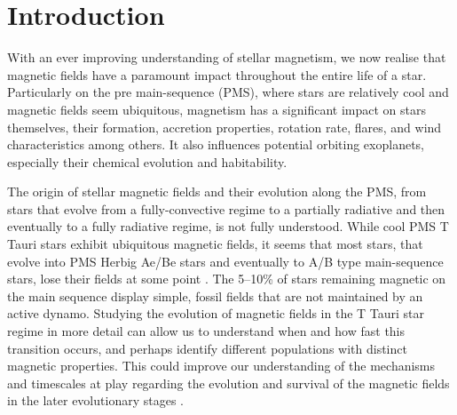 \documentclass{aa}
\begin{document}
   \maketitle
%
\section{Introduction}
With an ever improving understanding of stellar magnetism, we now realise that magnetic fields have a paramount impact throughout the entire life of a star. Particularly on the pre main-sequence (PMS), where stars are relatively cool and magnetic fields seem ubiquitous, magnetism has a significant impact on stars themselves, their formation, accretion properties, rotation rate, flares, and wind characteristics among others. It also influences potential orbiting exoplanets, especially their chemical evolution and habitability.

The origin of stellar magnetic fields and their evolution along the PMS, from stars that evolve from a fully-convective regime to a partially radiative and then eventually to a fully radiative regime, is not fully understood. While cool PMS T Tauri stars exhibit ubiquitous magnetic fields, it seems that most stars, that evolve into PMS Herbig Ae/Be stars and eventually to A/B type main-sequence stars, lose their fields at some point \citep{2013MNRAS.429.1001A,2019MNRAS.483.3127S}. The 5--10\% of stars remaining magnetic on the main sequence display simple, fossil fields that are not maintained by an active dynamo. Studying the evolution of magnetic fields in the T Tauri star regime in more detail can allow us to understand when and how fast this transition occurs, and perhaps identify different populations with distinct magnetic properties. This could improve our understanding of the mechanisms and timescales at play regarding the evolution and survival of the magnetic fields in the later evolutionary stages \citep{2019EAS....82..345A}.
\end{document}
